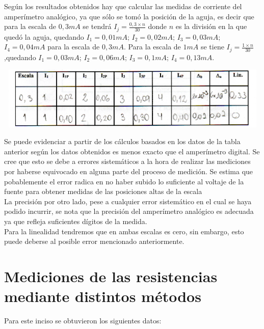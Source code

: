 \documentclass[12pt]{article}
\begin{document}
	\noindent Según los resultados obtenidos hay que calcular las medidas de corriente del amperímetro analógico, ya que sólo se tomó la posición de la aguja, es decir que para la escala de $0,3mA$ se tendrá $I_j = \frac{0,3 \times n}{30}$ donde $n$ es la división en la que quedó la aguja, quedando $I_1 = 0,01mA$; $I_2 = 0,02mA$; $I_3 = 0,03mA$; $I_4 = 0,04mA$ para la escala de $0,3mA$. Para la escala de $1mA$ se tiene $I_j = \frac{1 \times n}{30}$,quedando $I_1 = 0,03mA$; $I_2 = 0,06mA$; $I_3 = 0,1mA$; $I_4 = 0,13mA$.\\
	
	\begin{center}
		\includegraphics[width=16cm,height=3cm]{Img/anexo_1}
	\end{center}

	\noindent Se puede evidenciar a partir de los cálculos basados en los datos de la tabla anterior según los datos obtenidos es menos exacto que el amperímetro digital. Se cree que esto se debe a errores sistemáticos a la hora de realizar las mediciones por haberse equivocado en alguna parte del proceso de medición. Se estima que pobablemente el error radica en no haber subido lo suficiente al voltaje de la fuente para obtener medidas de las posiciones altas de la escala\\
	
	\noindent La precisión por otro lado, pese a cualquier error sistemático en el cual se haya podido incurrir, se nota que la precisión del amperímetro analógico es adecuada ya que refleja suficientes dígitos de la medida.\\
	
	\noindent Para la linealidad tendremos que en ambas escalas es cero, sin embargo, esto puede deberse al posible error mencionado anteriormente.
	
	\newpage
	
	\section{Mediciones de las resistencias mediante distintos métodos}
	
	\noindent Para este inciso se obtuvieron los siguientes datos:\\
	
\end{document}

